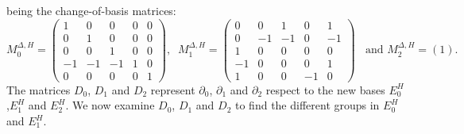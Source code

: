 \documentclass[a4paper,10pt]{article}
\newcommand{\mdh}{M^{\Delta,H}}
\begin{document}
being the change-of-basis matrices:
\[
\mdh_0=
\left(
\begin{array}{rrrrr}
 1 &  0 &  0 &  0 &  0 \\ 
 0 &  1 &  0 &  0 &  0 \\ 
 0 &  0 &  1 &  0 &  0 \\ 
-1 & -1 & -1 &  1 &  0 \\ 
 0 &  0 &  0 &  0 &  1
\end{array}
\right),\; \;
\mdh_1=
\left(
\begin{array}{rrrrr}
 0 &  0 &  1 &  0 &  1 \\ 
 0 & -1 & -1 &  0 & -1 \\ 
 1 &  0 &  0 &  0 &  0 \\ 
-1 &  0 &  0 &  0 &  1 \\ 
 1 &  0 &  0 & -1 &  0
\end{array}
\right)
\; \; \text{ and }
\mdh_2=
\left(1\right)
.
\]
The matrices \(D_0\), \(D_1\) and \(D_2\) represent \(\partial_0\), \(\partial_1\) and \(\partial_2\) respect to the new bases \(E^{H}_0\),\(E^{H}_1\) and \(E^{H}_2\). We now examine \(D_0\), \(D_1\) and \(D_2\) to find the different groups in \(E^{H}_0\) and \(E^{H}_1\).
\end{document}
